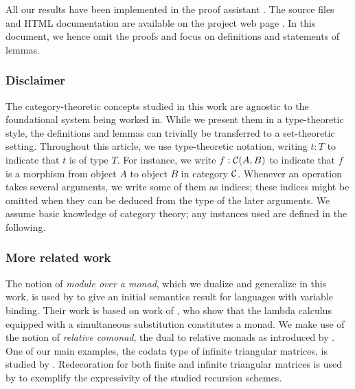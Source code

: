 \documentclass[envcountsame]{llncs}
\begin{document}
%  

 All our results have been implemented in the proof assistant \coq \parencite{coq84pl3}.
 The \coq source files and HTML documentation are available on the project web page \parencite{trimat_coq}.
 In this document, we hence omit the proofs and focus on definitions and statements of lemmas.
 
 
 \subsubsection*{Disclaimer}The category-theoretic concepts studied in this work are agnostic to the foundational system being worked in.
 While we present them in a type-theoretic style, the definitions and lemmas can trivially be transferred to a set-theoretic setting.
 Throughout this article, we use type-theoretic notation,  writing $t:T$ to indicate that $t$ is of type $T$. 
 For instance, we write $f : {\mathcal{C}}(A,B)$ to indicate that $f$ is a morphism from object $A$ to object $B$ in category ${\mathcal{C}}$.
 Whenever an operation takes several arguments, we write some of them as indices; these indices might be omitted when 
 they can be deduced from the type of the later arguments.
 We assume basic knowledge of category theory; any instances used are defined in the following.
  
 \subsubsection*{More related work}
 The notion of \emph{module over a monad}, which we dualize and generalize in this work, is used by \textcite{DBLP:journals/iandc/HirschowitzM10}
 to give an initial semantics result for languages with variable binding. 
 Their work is based on work of \textcite{alt_reus},
 who show that the lambda calculus equipped with a simultaneous substitution constitutes a monad.
 We make use of the notion of \emph{relative comonad}, the dual to relative monads as introduced by \textcite{DBLP:conf/fossacs/AltenkirchCU10}.
%  
 One of our main examples, the codata type of infinite triangular matrices, is studied by \textcite{DBLP:conf/types/MatthesP11}.
 Redecoration for both finite and infinite triangular matrices is used by \textcite{DBLP:journals/tcs/AbelMU05} to exemplify 
 the expressivity of the studied recursion schemes.
 
\end{document}

